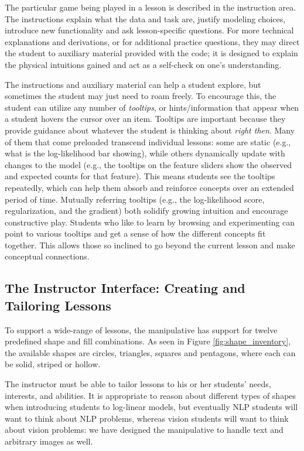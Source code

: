 \documentclass[11pt,letterpaper]{article}
\begin{document}
The particular game being played in a lesson is described in the
instruction area. The instructions explain what the data and task are, justify modeling
choices, introduce new functionality and ask lesson-specific questions. For more technical 
explanations and derivations, or for additional practice questions, 
they may direct the student to auxiliary material provided with the code; it is designed to explain 
the physical intuitions gained and act as a self-check on one's understanding. 

The instructions and auxiliary material can help a student explore, but sometimes the 
student may just need to roam freely. To encourage this, the student can utilize any number of 
\textit{tooltips}, or hints/information that appear when a student hovers the cursor over an item. 
Tooltips are important because they provide guidance about whatever the student is thinking about \textit{right then}.
Many of them that come preloaded transcend individual lessons: some are static (e.g., what is the 
log-likelihood bar showing), while others 
dynamically update with changes to the model (e.g., the tooltips on the feature sliders show the 
observed and expected counts for that feature).  
This means students see the tooltips repeatedly, which can help them absorb and reinforce concepts over an extended 
period of time. Mutually referring tooltips (e.g., the log-likelihood score, regularization, and the 
gradient) both solidify growing intuition and encourage constructive play. Students who like to learn by
browsing and experimenting can point to various tooltips and get a sense of how the different 
concepts fit together. This allows those so inclined to go beyond the current lesson and make conceptual 
connections.

\subsection{The Instructor Interface: Creating and Tailoring Lessons}\label{sec:tailoring}

To support a wide-range of lessons, the manipulative has support for twelve predefined shape and fill combinations.
As seen in Figure \ref{fig:shape_inventory}, the available shapes are circles, triangles, squares and pentagons,
where each can be solid, striped or hollow.

The instructor must be able to tailor lessons to his or her students' needs, 
interests, and abilities. It is appropriate to reason about different types of shapes
when introducing students to log-linear models, but eventually NLP students will want to think about 
NLP problems, whereas vision students will want to think about vision problems: we have designed the manipulative to handle text
and arbitrary images as well.
\end{document}
